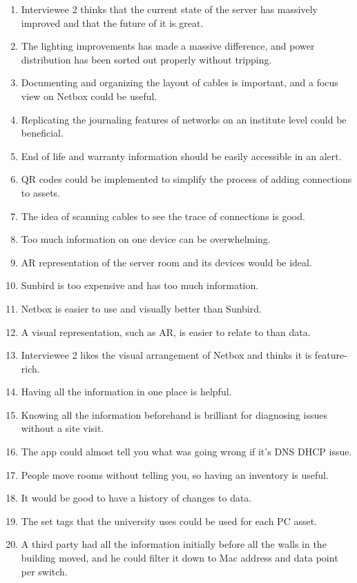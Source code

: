 \begin{enumerate}
    \item Interviewee 2 thinks that the current state of the server has massively improved and that the future of it is great.
    \item The lighting improvements has made a massive difference, and power distribution has been sorted out properly without tripping.
    \item Documenting and organizing the layout of cables is important, and a focus view on Netbox could be useful.
    \item Replicating the journaling features of networks on an institute level could be beneficial.
    \item End of life and warranty information should be easily accessible in an alert.
    \item QR codes could be implemented to simplify the process of adding connections to assets.
    \item The idea of scanning cables to see the trace of connections is good.
    \item Too much information on one device can be overwhelming.
    \item AR representation of the server room and its devices would be ideal.
    \item Sunbird is too expensive and has too much information.
    \item Netbox is easier to use and visually better than Sunbird.
    \item A visual representation, such as AR, is easier to relate to than data.
    \item Interviewee 2 likes the visual arrangement of Netbox and thinks it is feature-rich.
    \item Having all the information in one place is helpful.
    \item Knowing all the information beforehand is brilliant for diagnosing issues without a site visit.
    \item The app could almost tell you what was going wrong if it's DNS DHCP issue.
    \item People move rooms without telling you, so having an inventory is useful.
    \item It would be good to have a history of changes to data.
    \item The set tags that the university uses could be used for each PC asset.
    \item A third party had all the information initially before all the walls in the building moved, and he could filter it down to Mac address and data point per switch.
\end{enumerate}

